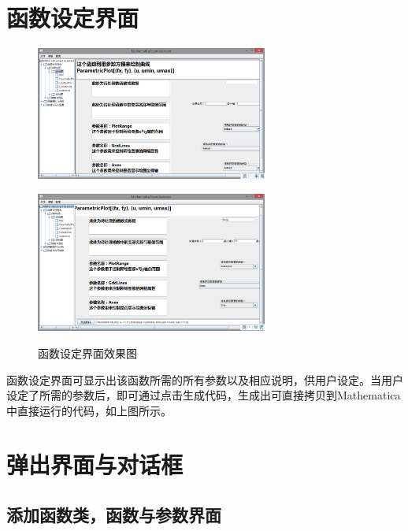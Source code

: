 \documentclass[hyperref, UTF8
,bookmarksnumbered=true, oneside]{ctexbook}
\begin{document}
		

	\section{函数设定界面} %


		\begin{figure}[!h]
			\begin{minipage}[b]{0.45\textwidth}
			\centering
			\includegraphics[width=3in]{Right2.png}
			\label{pic:MathPack}
			\end{minipage}%
			\hspace{0.1\textwidth}%
			\begin{minipage}[b]{0.45\textwidth}
			\centering
			\includegraphics[width=3in]{Right3.png}
			\label{pic:GUIPack}
			\end{minipage}
			\caption{函数设定界面效果图}
		\end{figure}

		函数设定界面可显示出该函数所需的所有参数以及相应说明，供用户设定。当用户设定了所需的参数后，即可通过点击生成代码，生成出可直接拷贝到Mathematica中直接运行的代码，如上图所示。

		

	\section{弹出界面与对话框} %
		
		\subsection{添加函数类，函数与参数界面} %
\end{document}
